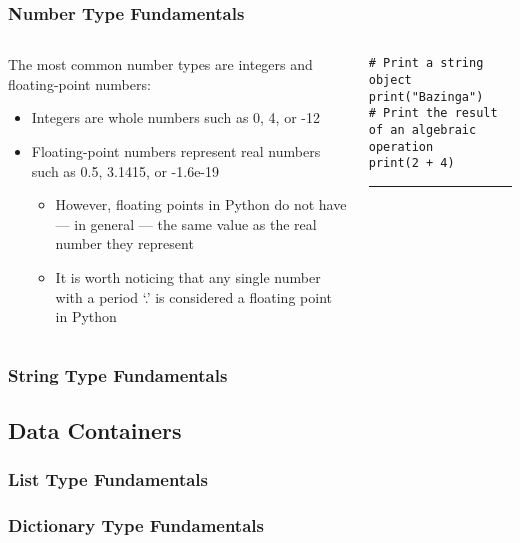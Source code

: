\documentclass[aspectratio=1610]{beamer}
\begin{document}
\begin{frame}
    \frametitle{Number Type Fundamentals}
    \begin{columns}
        \begin{column}{0.5\textwidth}
            The most common number types are integers and floating-point numbers:
            \begin{itemize}
                \item Integers are whole numbers such as 0, 4, or -12
                \item Floating-point numbers represent real numbers such as 0.5, 3.1415, or -1.6e-19
                \begin{itemize}
                    \item However, floating points in Python do not have --- in general
                    --- the same value as the real number they represent
                    \item It is worth noticing that any single number with a period `.'
                    is considered a floating point in Python 
                \end{itemize}
            \end{itemize}
        \end{column}
        \begin{column}{0.5\textwidth}
            \begin{verbatim}
# Print a string object
print("Bazinga")
# Print the result of an algebraic operation
print(2 + 4)
	        \end{verbatim}
		\rule{\textwidth}{1pt}
        \end{column}
    \end{columns}
\end{frame}

\begin{frame}
    \frametitle{String Type Fundamentals}
\end{frame}

\subsection{Data Containers}

\begin{frame}
    \frametitle{List Type Fundamentals}
\end{frame}
\begin{frame}
    \frametitle{Dictionary Type Fundamentals}
\end{frame}
\end{document}
